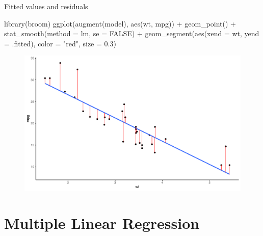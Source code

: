 \documentclass[
  18 pt,
  ignorenonframetext,
  aspectratio=1610,
]{beamer}
\newenvironment{Shaded}{\begin{snugshade}}{\end{snugshade}}
\newcommand{\AttributeTok}[1]{\textcolor[rgb]{0.40,0.45,0.13}{#1}}
\newcommand{\ConstantTok}[1]{\textcolor[rgb]{0.56,0.35,0.01}{#1}}
\newcommand{\FloatTok}[1]{\textcolor[rgb]{0.68,0.00,0.00}{#1}}
\newcommand{\FunctionTok}[1]{\textcolor[rgb]{0.28,0.35,0.67}{#1}}
\newcommand{\NormalTok}[1]{\textcolor[rgb]{0.00,0.23,0.31}{#1}}
\newcommand{\SpecialCharTok}[1]{\textcolor[rgb]{0.37,0.37,0.37}{#1}}
\newcommand{\StringTok}[1]{\textcolor[rgb]{0.13,0.47,0.30}{#1}}
\begin{document}
\begin{frame}[fragile]{Fitted values and residuals}
\protect\hypertarget{fitted-values-and-residuals}{}
\tiny

\begin{Shaded}
\begin{Highlighting}[]
\FunctionTok{library}\NormalTok{(broom)}
\FunctionTok{ggplot}\NormalTok{(}\FunctionTok{augment}\NormalTok{(model), }\FunctionTok{aes}\NormalTok{(wt, mpg)) }\SpecialCharTok{+}
  \FunctionTok{geom\_point}\NormalTok{() }\SpecialCharTok{+}
  \FunctionTok{stat\_smooth}\NormalTok{(}\AttributeTok{method =}\NormalTok{ lm, }\AttributeTok{se =} \ConstantTok{FALSE}\NormalTok{) }\SpecialCharTok{+}
  \FunctionTok{geom\_segment}\NormalTok{(}\FunctionTok{aes}\NormalTok{(}\AttributeTok{xend =}\NormalTok{ wt, }\AttributeTok{yend =}\NormalTok{ .fitted), }\AttributeTok{color =} \StringTok{"red"}\NormalTok{, }\AttributeTok{size =} \FloatTok{0.3}\NormalTok{)}
\end{Highlighting}
\end{Shaded}

\begin{figure}

{\centering \includegraphics[width=\textwidth,height=0.5\textheight]{R-Regression_files/figure-beamer/unnamed-chunk-13-1.pdf}

}

\end{figure}
\end{frame}

\hypertarget{multiple-linear-regression-1}{%
\section{Multiple Linear
Regression}\label{multiple-linear-regression-1}}
\end{document}
